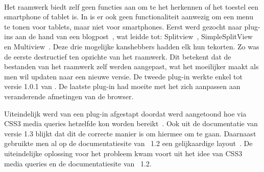 \begin{table}[H]
\centering
{}
\caption{Gebruik van  voor \st{}~(\sta), \kendo{}~(\kendoa), \jqm{}~(\jqma) en \lungo{}~(\lungoa).}
\label{tabel:evaluatie-gebruik-toestel}
\end{table}

\paragraph{\jqm}
Het raamwerk biedt zelf geen functies aan om te het herkennen of het toestel een smartphone of tablet is.
In \jqm{} is er ook geen functionaliteit aanwezig om een menu te tonen voor tablets, maar niet voor smartphones. 
Eerst werd gezocht naar plug-ins aan de hand van een blogpost~\cite{Deering2012}, wat leidde tot: Splitview~\cite{Rahman2013}, SimpleSplitView~\cite{Yared2013} en Multiview~\cite{Franck2012}. 
Deze drie mogelijke kanshebbers hadden elk hun tekorten. 
Zo was de eerste destructief ten opzichte van het raamwerk. 
Dit betekent dat de bestanden van het raamwerk zelf werden aangepast, wat het moeilijker maakt als men wil updaten naar een nieuwe versie. 
De tweede plug-in werkte enkel tot versie 1.0.1 van \jqm{}. 
De laatste plug-in had moeite met het zich aanpassen aan veranderende afmetingen van de browser. 

Uiteindelijk werd van een plug-in afgestapt doordat werd aangetoond hoe via CSS3 media queries hetzelfde kon worden bereikt~\cite{Hadlock2012}. 
Ook uit de documentatie van versie 1.3 \cite{JQuery2013e} blijkt dat dit de correcte manier is om hiermee om te gaan.
Daarnaast gebruikte men al op de documentatiesite van \jqm{}~1.2 een gelijkaardige layout~\cite{JQuery2012b}. 
De uiteindelijke oplossing voor het probleem kwam voort uit het idee van CSS3 media queries en de documentatiesite van \jqm{}~1.2.

